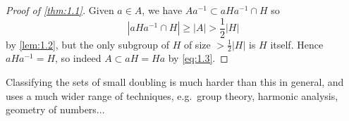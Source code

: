 \documentclass{article}
\numberwithin{equation}{section}
\begin{document}
\begin{proof}[Proof of \cref{thm:1.1}]
  Given $a \in A$, we have $A a^{-1} \subset a H a^{-1} \cap H$ so
  \begin{equation*}|a H a^{-1} \cap H| \geq |A| > \frac{1}{2} |H|\end{equation*}
  by \cref{lem:1.2}, but the only subgroup of $H$ of size $> \frac{1}{2}|H|$ is $H$ itself.
  Hence $a H a^{-1} = H$, so indeed $A \subset a H = Ha$ by \eqref{eq:1.3}.
\end{proof}
Classifying the sets of small doubling is much harder than this in general, and uses a much wider range of techniques, e.g.\ group theory, harmonic analysis, geometry of numbers...
\printindex
\end{document}
